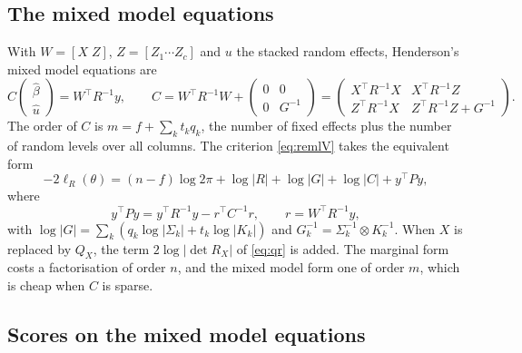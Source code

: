 \documentclass[article,nojss]{jss}
\begin{document}
\subsection{The mixed model equations}

With $W = [X \; Z]$, $Z = [Z_1 \cdots Z_c]$ and $u$ the stacked random
effects, Henderson's mixed model equations \citep{henderson1975} are
\begin{equation}\label{eq:mme}
  C \begin{pmatrix}\hat\beta \\ \hat u\end{pmatrix} = W^\top R^{-1} y,
  \qquad
  C = W^\top R^{-1} W + \begin{pmatrix} 0 & 0 \\ 0 & G^{-1}\end{pmatrix}
    = \begin{pmatrix}
      X^\top R^{-1} X & X^\top R^{-1} Z \\
      Z^\top R^{-1} X & Z^\top R^{-1} Z + G^{-1}
    \end{pmatrix}.
\end{equation}
The order of $C$ is $m = f + \sum_k t_k q_k$, the number of fixed effects plus
the number of random levels over all columns. The criterion
\eqref{eq:remlV} takes the equivalent form
\begin{equation}\label{eq:remlC}
  -2\ell_R(\theta) = (n-f)\log 2\pi + \log|R| + \log|G| + \log|C| +
  y^\top P y,
\end{equation}
where
\begin{equation}\label{eq:yPy}
  y^\top P y = y^\top R^{-1}y - r^\top C^{-1} r,
  \qquad r = W^\top R^{-1} y,
\end{equation}
with $\log|G| = \sum_k \left(q_k \log|\Sigma_k| + t_k \log|K_k|\right)$ and
$G_k^{-1} = \Sigma_k^{-1} \otimes K_k^{-1}$. When $X$ is replaced by $Q_X$,
the term $2\log|\det R_X|$ of \eqref{eq:qr} is added. The marginal form costs
a factorisation of order $n$, and the mixed model form one of order $m$, which
is cheap when $C$ is sparse.

\subsection{Scores on the mixed model equations}
\end{document}
